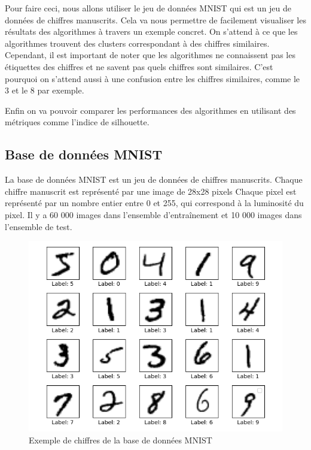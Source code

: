 \documentclass[french,a4paper,18pt]{article}
\begin{document}
Pour faire ceci, nous allons utiliser le jeu de données MNIST qui est un jeu de données de chiffres manuscrits.
Cela va nous permettre de facilement visualiser les résultats des algorithmes à travers un exemple concret.
On s'attend à ce que les algorithmes trouvent des clusters correspondant à des chiffres similaires. 
Cependant, il est important de noter que les algorithmes ne connaissent pas les étiquettes des chiffres et ne savent pas quels chiffres sont similaires.
C'est pourquoi on s'attend aussi à une confusion entre les chiffres similaires, comme le 3 et le 8 par exemple.

Enfin on va pouvoir comparer les performances des algorithmes en utilisant des métriques comme l'indice de silhouette.

\subsection{Base de données MNIST}
La base de données MNIST est un jeu de données de chiffres manuscrits. 
Chaque chiffre manuscrit est représenté par une image de 28x28 pixels 
Chaque pixel est représenté par un nombre entier entre 0 et 255, qui correspond à la luminosité du pixel.
Il y a 60 000 images dans l'ensemble d'entraînement et 10 000 images dans l'ensemble de test.

\begin{figure}[h!]
    \centering
    \includegraphics[scale=0.5]{images/mnist_plot.png}
    \caption{Exemple de chiffres de la base de données MNIST}\label{fig:mnist}
\end{figure}
\end{document}
